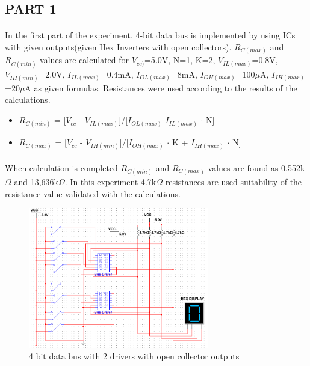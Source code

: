 \documentclass[pdftex,12pt,a4paper]{article}
\begin{document}
\begin{flushleft}
\subsection{PART 1}

\paragraph{}
In the first part of the experiment, 4-bit data bus is implemented by using ICs with given outputs(given Hex Inverters with open collectors). $R_{C(max)}$ and $R_{C(min)}$ values are calculated for $V_{cc)}$=5.0V, N=1, K=2, $V_{IL(max)}$=0.8V, $V_{IH(min)}$=2.0V, $I_{IL(max)}$=0.4mA, $I_{OL(max)}$=8mA, $I_{OH(max)}$=100$\mu$A,  $I_{IH(max)}$=20$\mu$A as given formulas. Resistances were used according to the results of the calculations. 



\begin{itemize}
    \item $R_{C(min)}$ = [$V_{cc}$ - $V_{IL(max)}$]/[$I_{OL(max)}$-$I_{IL(max)}$ $\cdot$ N]
    \item $R_{C(max)}$ = [$V_{cc}$ - $V_{IH(min)}$]/[$I_{OH(max)}$ $\cdot$ K + $I_{IH(max)}$ $\cdot$ N]
\end{itemize}

\paragraph{}    
When calculation is completed $R_{C(min)}$ and $R_{C(max)}$ values are found as 0.552k$\Omega$ and 13,636k$\Omega$. In this experiment 4.7k$\Omega$ resistances are used suitability of the resistance value validated with the calculations.

\begin{figure}[h]
	\centering
	\includegraphics[width=0.7\textwidth]{part1.png}	
	\caption{4 bit data bus with 2 drivers with open collector outputs}
	\label{circ:part1}
\end{figure}


\end{flushleft}
\end{document}
